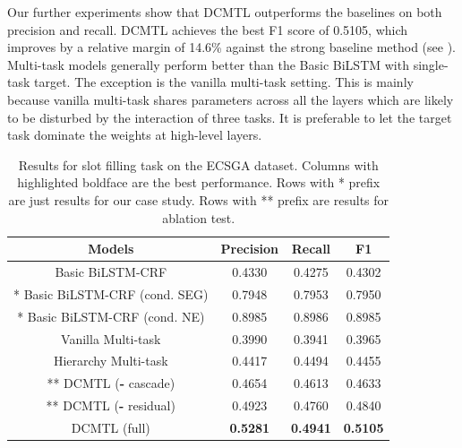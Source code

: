 Our further experiments show that DCMTL outperforms the 
baselines on both precision and recall.
DCMTL achieves the best F1 score of 0.5105, 
which improves by a relative margin of 14.6\% 
against the strong baseline method (see ).
Multi-task models generally perform better than the Basic 
BiLSTM with single-task target.
The exception is the vanilla multi-task setting.
This is mainly because 
vanilla multi-task shares parameters across all the layers
which are likely to be disturbed by the interaction of three tasks.
It is preferable to let the target task dominate the weights at 
high-level layers.
\begin{table}[htbp]
	\centering
	\scriptsize
	\begin{tabular}{c|ccc}
		\toprule
		Models & Precision & Recall & F1 \\
		\midrule
		Basic BiLSTM-CRF & 0.4330 & 0.4275 & 0.4302 \\
		* Basic BiLSTM-CRF (cond. SEG) & 0.7948 & 0.7953 & 0.7950 \\
		* Basic BiLSTM-CRF (cond. NE) & 0.8985 & 0.8986 & 0.8985 \\
		\midrule
		Vanilla Multi-task & 0.3990 & 0.3941 & 0.3965 \\
		Hierarchy Multi-task & 0.4417 & 0.4494 & 0.4455 \\
		\midrule
		** DCMTL (\textbf{-} cascade) & 0.4654  & 0.4613 & 0.4633  \\
		** DCMTL (\textbf{-} residual) & 0.4923 & 0.4760 & 0.4840  \\
		DCMTL (full) & \textbf{0.5281} & \textbf{0.4941} & \textbf{0.5105} \\
		\bottomrule
	\end{tabular}
	\caption{Results for slot filling task on the ECSGA dataset.
			Columns with highlighted boldface are the best performance.
			Rows with * prefix are just results for our case study.
			Rows with ** prefix are results for ablation test.}
	\label{tab:eval_ECSGA}
	\vspace{-10pt}
\end{table}

